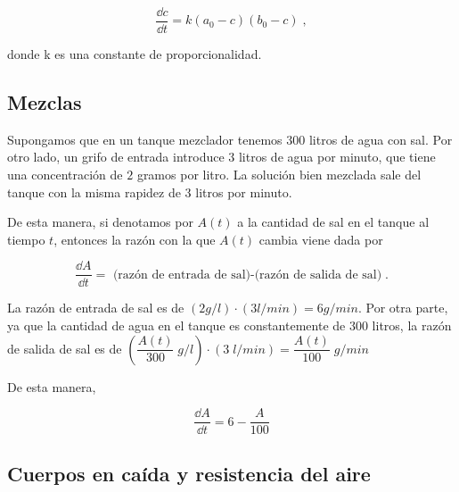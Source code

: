 \begin{small}
\begin{equation*}
	\frac {\dd c}{\dd t}=k(a_0-c)(b_0-c)\; ,
\end{equation*} 
   
donde k es una constante de proporcionalidad. 

\subsection{Mezclas} 
   
   Supongamos que en un tanque mezclador tenemos $300$ litros de agua con sal. Por otro lado, un grifo de entrada introduce $3$ litros de agua por minuto, que tiene una concentración de $2$ gramos por litro. La solución bien mezclada sale del tanque con la misma rapidez de $3$ litros por minuto. 
   
De esta manera, si denotamos por $A(t)$ a la cantidad de sal en el tanque al tiempo $t$, entonces la razón con la que $A(t)$ cambia viene dada por 
   
   \begin{equation*}
   	\dfrac {\dd A}{\dd t}= \text{ (razón de entrada de sal)-(razón de salida de sal)}\; .
   \end{equation*}
   
La razón de entrada de sal es de $(2g/l) \cdot (3l/min) = 6g/min$. Por otra parte, ya que la cantidad de agua en el tanque es constantemente de $300$ litros, la 
razón de salida de sal es de $\displaystyle \left(\dfrac {A(t)}{300}\; g/l \right) \cdot \left( 3 \; l/min \right)=\dfrac {A(t)}{100}\; g/min$
   
De esta manera, 
   
   \begin{equation*}
   	\dfrac {\dd A}{\dd t}=6-\dfrac {A}{100}
   \end{equation*}
   

\subsection{Cuerpos en caída y resistencia del aire}
   

\end{small}

